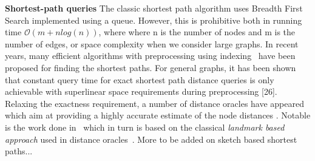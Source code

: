 \textbf{Shortest-path queries} The classic shortest path algorithm uses Breadth First Search implemented using a queue. However, this is prohibitive both in running time 
$\mathcal{O}(m + n log(n))$, where where n is the number of nodes and m is the
number of edges, or space complexity when we consider large graphs. In recent years, many efficient algorithms with preprocessing using indexing~\cite{goldberg2005computing,gutman2004reach} have been proposed for finding the shortest paths. For general
graphs, it has been shown that constant query time for exact shortest path distance queries is only achievable with superlinear space requirements during preprocessing [26]. Relaxing the exactness requirement, a number of distance oracles
have appeared which aim at providing a highly accurate estimate
of the node distances \cite{sankaranarayanan2009distance,zwick2001exact,thorup2005approximate}. Notable is the work done in~\cite{gubichev2010fast,das2010sketch} which in turn is based on the classical \emph{landmark based approach} used in distance oracles~\cite{thorup2005approximate}. More to be added on sketch based shortest paths...

